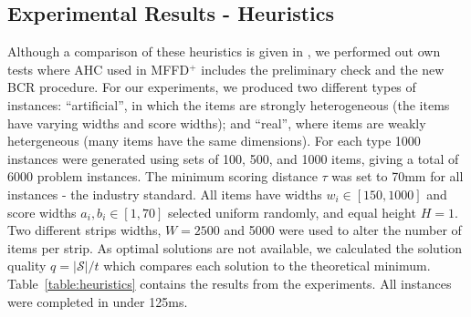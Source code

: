 \documentclass{elsarticle}
\begin{document}
\subsection{Experimental Results - Heuristics}
\label{sub:expheuristics}
\noindent Although a comparison of these heuristics is given in \cite{hawa2018}, we performed out own tests where AHC used in MFFD$^+$ includes the preliminary check and the new BCR procedure. For our experiments, we produced two different types of instances: ``artificial'', in which the items are strongly heterogeneous (the items have varying widths and score widths); and ``real'', where items are weakly hetergeneous (many items have the same dimensions). For each type 1000 instances were generated using sets of 100, 500, and 1000 items, giving a total of 6000 problem instances. The minimum scoring distance $\tau$ was set to 70mm for all instances - the industry standard. All items have widths $w_i \in [150,1000]$ and score widths $a_i, b_i \in [1,70]$ selected uniform randomly, and equal height $H=1$. Two different strips widths, $W = 2500$ and 5000 were used to alter the number of items per strip. As optimal solutions are not available, we calculated the solution quality $q = |\mathcal{S}|/ t$ which compares each solution to the theoretical minimum. Table~\ref{table:heuristics} contains the results from the experiments. All instances were completed in under 125ms.
\end{document}
